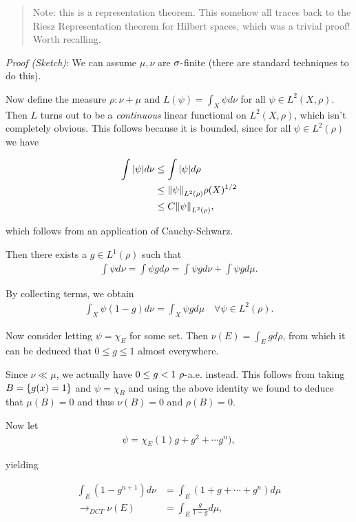 \begin{quote}
Note: this is a representation theorem. This somehow all traces back to
the Riesz Representation theorem for Hilbert spaces, which was a trivial
proof! Worth recalling.
\end{quote}

\emph{Proof (Sketch)}: We can assume \(\mu, \nu\) are
\(\sigma{\hbox{-}}\)finite (there are standard techniques to do this).

Now define the measure \(\rho: \nu + \mu\) and
\(L(\psi) = \int_X \psi d\nu\) for all \(\psi \in L^2(X, \rho)\). Then
\(L\) turns out to be a \emph{continuous} linear functional on
\(L^2(X, \rho)\), which isn't completely obvious. This follows because
it is bounded, since for all \(\psi \in L^2(\rho)\) we have

\begin{align*}
\int {\left\lvert {\psi} \right\rvert} d\nu 
&\leq \int {\left\lvert {\psi} \right\rvert} d\rho \\
&\leq {\left\lVert {\psi} \right\rVert}_{L^2(\rho)} \rho(X)^{1/2} \\
&\leq C {\left\lVert {\psi} \right\rVert}_{L^2(\rho)}
,\end{align*}

which follows from an application of Cauchy-Schwarz.

Then there exists a \(g\in L^1(\rho)\) such that
\begin{align*}
\int \psi d\nu = \int \psi g d\rho = \int \psi g d\nu + \int \psi g d\mu
.\end{align*}

By collecting terms, we obtain
\begin{align*}
\int_X \psi(1-g) d\nu = \int_X \psi g d\mu \quad \forall \psi\in L^2(\rho).
\end{align*}

Now consider letting \(\psi = \chi_E\) for some set. Then
\(\nu(E) = \int_E g d\rho\), from which it can be deduced that
\(0\leq g \leq 1\) almost everywhere.

Since \(\nu \ll \mu\), we actually have \(0\leq g < 1~ \rho{\hbox{-}}\)a.e.
instead. This follows from taking \(B = \left\{{g(x) = 1}\right\}\) and
\(\psi = \chi_B\) and using the above identity we found to deduce that
\(\mu(B) = 0\) and thus \(\nu(B) = 0\) and \(\rho(B) = 0\).

Now let
\begin{align*}
\psi = \chi_E(1 ) g + g^2 + \cdots g^n)
,\end{align*}

yielding

\begin{align*}
\int_E (1-g^{n+1}) d\nu &= \int_E (1 + g + \cdots + g^n) d\mu \\
\to_{DCT} \nu(E) &= \int_E \frac{g}{1-g} d\mu
,\end{align*}

